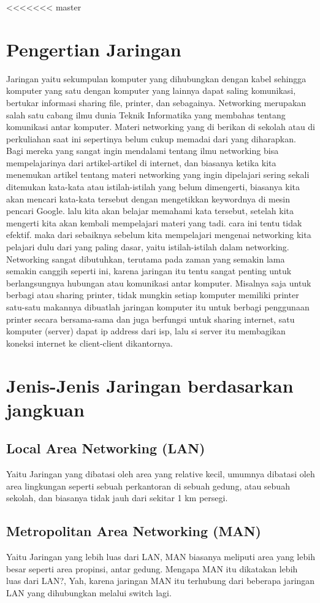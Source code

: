 <<<<<<< master
\section{Pengertian Jaringan}
  Jaringan yaitu sekumpulan komputer yang dihubungkan dengan kabel sehingga komputer yang satu dengan komputer yang lainnya dapat saling komunikasi, bertukar informasi sharing file, printer, dan sebagainya.
  Networking merupakan salah satu cabang ilmu dunia Teknik Informatika yang membahas tentang komunikasi antar komputer. Materi networking yang di berikan di sekolah atau di perkuliahan saat ini sepertinya belum cukup memadai dari yang diharapkan. Bagi mereka yang sangat ingin mendalami tentang ilmu networking bisa mempelajarinya dari artikel-artikel di internet, dan biasanya ketika kita menemukan artikel tentang materi networking yang ingin dipelajari sering sekali ditemukan kata-kata atau istilah-istilah yang belum dimengerti, biasanya kita akan mencari kata-kata tersebut dengan mengetikkan keywordnya di mesin pencari Google. lalu kita akan belajar memahami kata tersebut, setelah kita mengerti kita akan kembali mempelajari materi yang tadi. cara ini tentu tidak efektif. maka dari sebaiknya sebelum kita mempelajari mengenai networking kita pelajari dulu dari yang paling dasar, yaitu istilah-istilah dalam networking.
  Networking sangat dibutuhkan, terutama pada zaman yang semakin lama semakin canggih seperti ini, karena jaringan itu tentu sangat penting untuk berlangsungnya hubungan atau komunikasi antar komputer. Misalnya saja untuk berbagi atau sharing printer, tidak mungkin setiap komputer memiliki printer satu-satu makannya dibuatlah jaringan komputer itu untuk berbagi penggunaan printer secara bersama-sama dan juga berfungsi untuk sharing internet, satu komputer (server) dapat ip address dari isp, lalu si server itu membagikan koneksi internet ke client-client dikantornya.

\section{Jenis-Jenis Jaringan berdasarkan jangkuan}
  \subsection{Local Area Networking (LAN)}
    Yaitu Jaringan yang dibatasi oleh area yang relative kecil, umumnya dibatasi oleh area lingkungan seperti sebuah perkantoran di sebuah gedung, atau sebuah sekolah, dan biasanya tidak jauh dari sekitar 1 km persegi.
  \subsection{Metropolitan Area Networking (MAN)}
    Yaitu Jaringan yang lebih luas dari LAN, MAN biasanya meliputi area yang lebih besar seperti area propinsi, antar gedung. Mengapa MAN itu dikatakan lebih luas dari LAN?, Yah, karena jaringan MAN itu terhubung dari beberapa jaringan LAN yang dihubungkan melalui switch lagi.

